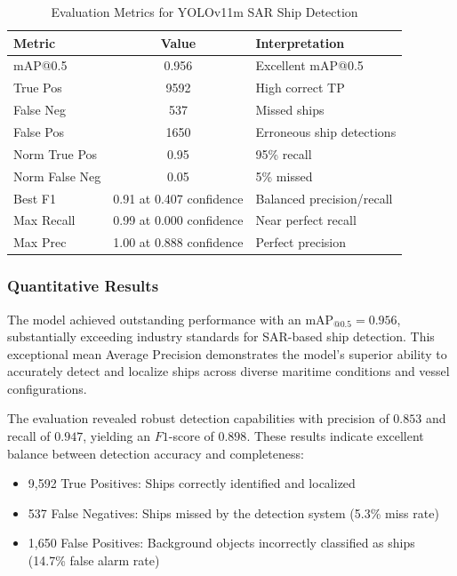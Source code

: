 \documentclass{article}
\begin{document}
	\begin{table}[htbp]
		\centering
		\caption{Evaluation Metrics for YOLOv11m SAR Ship Detection}
		\begin{tabularx}{\textwidth}{|l|c|X|}
			\hline
			\textbf{Metric} & \textbf{Value} & \textbf{Interpretation} \\
			\hline
			mAP@0.5 & 0.956 & Excellent mAP@0.5 \\
			\hline
			True Pos & 9592 & High correct TP \\
			\hline
			False Neg & 537 & Missed ships \\
			\hline
			False Pos & 1650 & Erroneous ship detections \\
			\hline
			Norm True Pos & 0.95 & 95\% recall \\
			\hline
			Norm False Neg & 0.05 & 5\% missed \\
			\hline
			Best F1 & 0.91 at 0.407 confidence & Balanced precision/recall \\
			\hline
			Max Recall & 0.99 at 0.000 confidence & Near perfect recall \\
			\hline
			Max Prec & 1.00 at 0.888 confidence & Perfect precision \\
			\hline
		\end{tabularx}
	\end{table}
	
	
	\subsubsection{Quantitative Results}
	The model achieved outstanding performance with an $\text{mAP}_{@0.5} = 0.956$, substantially exceeding industry standards for SAR-based ship detection. This exceptional mean Average Precision demonstrates the model's superior ability to accurately detect and localize ships across diverse maritime conditions and vessel configurations.
	
	The evaluation revealed robust detection capabilities with precision of $0.853$ and recall of $0.947$, yielding an $F1$-score of $0.898$. These results indicate excellent balance between detection accuracy and completeness:
	
	\begin{itemize}
		\item 9,592 True Positives: Ships correctly identified and localized
		\item 537 False Negatives: Ships missed by the detection system (5.3\% miss rate)
		\item 1,650 False Positives: Background objects incorrectly classified as ships (14.7\% false alarm rate)
	\end{itemize}
	
\end{document}
